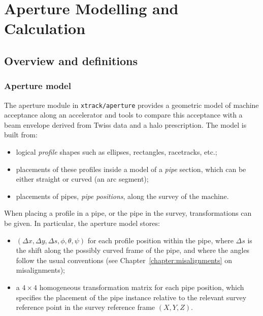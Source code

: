 \newcommand{\racetrack}[6]{%
    ({#1 + #3}, {#2 - #4 + #6})
    arc[start angle=0, end angle=-90, x radius=#5, y radius=#6]
    -- ({#1 - #3 + #5}, {#2 - #4})
    arc[start angle=-90, end angle=-180, x radius=#5, y radius=#6]
    -- ({#1 - #3}, {#2 + #4 - #6})
    arc[start angle=180, end angle=90, x radius=#5, y radius=#6]
    -- ({#1 + #3 - #5}, {#2 + #4})
    arc[start angle=90, end angle=0, x radius=#5, y radius=#6]
    -- cycle
}
\newcommand{\ttlabel}[1]{\lstinline[basicstyle={\ttfamily\footnotesize}]{#1}}

\chapter{Aperture Modelling and Calculation}

\section{Overview and definitions}

\subsection{Aperture model}

The aperture module in \lstinline|xtrack/aperture| provides a geometric model of machine acceptance along an accelerator and tools to compare this acceptance with a beam envelope derived from Twiss data and a halo prescription.
The model is built from:
\begin{itemize}
    \item logical \emph{profile} shapes such as ellipses, rectangles, racetracks, etc.;
    \item placements of these profiles inside a model of a \emph{pipe} section, which can be either straight or curved (an arc segment);
    \item placements of pipes, \emph{pipe positions}, along the survey of the machine.
\end{itemize}
When placing a profile in a pipe, or the pipe in the survey, transformations can be given.
In particular, the aperture model stores:
\begin{itemize}
	\item $(\Delta x, \Delta y, \Delta s, \phi, \theta, \psi)$ for each profile position within the pipe, where $\Delta s$ is the shift along the possibly curved frame of the pipe, and where the angles follow the usual conventions (see Chapter~\ref{chapter:misalignments} on misalignments);
	\item a $4 \times 4$ homogeneous transformation matrix for each pipe position, which specifies the placement of the pipe instance relative to the relevant survey reference point in the survey reference frame $(X, Y, Z)$.
\end{itemize}

